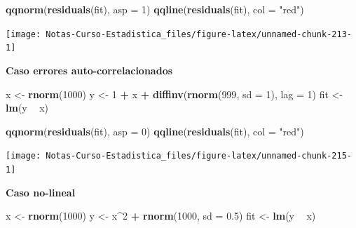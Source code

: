 \documentclass[
  12pt,
]{book}
\newenvironment{Shaded}{\begin{snugshade}}{\end{snugshade}}
\newcommand{\DataTypeTok}[1]{\textcolor[rgb]{0.13,0.29,0.53}{#1}}
\newcommand{\DecValTok}[1]{\textcolor[rgb]{0.00,0.00,0.81}{#1}}
\newcommand{\FloatTok}[1]{\textcolor[rgb]{0.00,0.00,0.81}{#1}}
\newcommand{\KeywordTok}[1]{\textcolor[rgb]{0.13,0.29,0.53}{\textbf{#1}}}
\newcommand{\NormalTok}[1]{#1}
\newcommand{\OperatorTok}[1]{\textcolor[rgb]{0.81,0.36,0.00}{\textbf{#1}}}
\newcommand{\StringTok}[1]{\textcolor[rgb]{0.31,0.60,0.02}{#1}}
\theoremstyle{definition}
\theoremstyle{definition}
\theoremstyle{definition}
\theoremstyle{remark}
\begin{document}
\begin{Shaded}
\begin{Highlighting}[]
\KeywordTok{qqnorm}\NormalTok{(}\KeywordTok{residuals}\NormalTok{(fit), }\DataTypeTok{asp =} \DecValTok{1}\NormalTok{)}
\KeywordTok{qqline}\NormalTok{(}\KeywordTok{residuals}\NormalTok{(fit), }\DataTypeTok{col =} \StringTok{"red"}\NormalTok{)}
\end{Highlighting}
\end{Shaded}

\begin{center}\texttt{[image: Notas-Curso-Estadistica\_files/figure-latex/unnamed-chunk-213-1]} \end{center}

\textbf{Caso errores auto-correlacionados}

\begin{Shaded}
\begin{Highlighting}[]
\NormalTok{x <-}\StringTok{ }\KeywordTok{rnorm}\NormalTok{(}\DecValTok{1000}\NormalTok{)}
\NormalTok{y <-}\StringTok{ }\DecValTok{1} \OperatorTok{+}\StringTok{ }\NormalTok{x }\OperatorTok{+}\StringTok{ }\KeywordTok{diffinv}\NormalTok{(}\KeywordTok{rnorm}\NormalTok{(}\DecValTok{999}\NormalTok{, }\DataTypeTok{sd =} \DecValTok{1}\NormalTok{), }\DataTypeTok{lag =} \DecValTok{1}\NormalTok{)}
\NormalTok{fit <-}\StringTok{ }\KeywordTok{lm}\NormalTok{(y }\OperatorTok{~}\StringTok{ }\NormalTok{x)}
\end{Highlighting}
\end{Shaded}

\begin{Shaded}
\begin{Highlighting}[]
\KeywordTok{qqnorm}\NormalTok{(}\KeywordTok{residuals}\NormalTok{(fit), }\DataTypeTok{asp =} \DecValTok{0}\NormalTok{)}
\KeywordTok{qqline}\NormalTok{(}\KeywordTok{residuals}\NormalTok{(fit), }\DataTypeTok{col =} \StringTok{"red"}\NormalTok{)}
\end{Highlighting}
\end{Shaded}

\begin{center}\texttt{[image: Notas-Curso-Estadistica\_files/figure-latex/unnamed-chunk-215-1]} \end{center}

\textbf{Caso no-lineal}

\begin{Shaded}
\begin{Highlighting}[]
\NormalTok{x <-}\StringTok{ }\KeywordTok{rnorm}\NormalTok{(}\DecValTok{1000}\NormalTok{)}
\NormalTok{y <-}\StringTok{ }\NormalTok{x}\OperatorTok{^}\DecValTok{2} \OperatorTok{+}\StringTok{ }\KeywordTok{rnorm}\NormalTok{(}\DecValTok{1000}\NormalTok{, }\DataTypeTok{sd =} \FloatTok{0.5}\NormalTok{)}
\NormalTok{fit <-}\StringTok{ }\KeywordTok{lm}\NormalTok{(y }\OperatorTok{~}\StringTok{ }\NormalTok{x)}
\end{Highlighting}
\end{Shaded}
\end{document}
